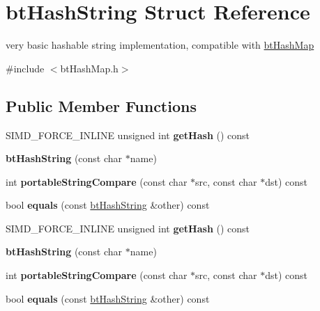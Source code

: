 \hypertarget{structbtHashString}{}\section{bt\+Hash\+String Struct Reference}
\label{structbtHashString}


very basic hashable string implementation, compatible with \hyperlink{classbtHashMap}{bt\+Hash\+Map}  




{\ttfamily \#include $<$bt\+Hash\+Map.\+h$>$}

\subsection*{Public Member Functions}
\begin{DoxyCompactItemize}
\item 
\mbox{\label{structbtHashString_aeaa1a7bd2e1424b713903fa836ee050e}} 
S\+I\+M\+D\+\_\+\+F\+O\+R\+C\+E\+\_\+\+I\+N\+L\+I\+NE unsigned int {\bfseries get\+Hash} () const
\item 
\mbox{\label{structbtHashString_a66defd26b7b6b4c56d2f4abd35379eee}} 
{\bfseries bt\+Hash\+String} (const char $\ast$name)
\item 
\mbox{\label{structbtHashString_a28c2b90627bc2c2345909f992d0955dd}} 
int {\bfseries portable\+String\+Compare} (const char $\ast$src, const char $\ast$dst) const
\item 
\mbox{\label{structbtHashString_a042484497f527e8a6a1265c2f852038d}} 
bool {\bfseries equals} (const \hyperlink{structbtHashString}{bt\+Hash\+String} \&other) const
\item 
\mbox{\label{structbtHashString_aeaa1a7bd2e1424b713903fa836ee050e}} 
S\+I\+M\+D\+\_\+\+F\+O\+R\+C\+E\+\_\+\+I\+N\+L\+I\+NE unsigned int {\bfseries get\+Hash} () const
\item 
\mbox{\label{structbtHashString_a66defd26b7b6b4c56d2f4abd35379eee}} 
{\bfseries bt\+Hash\+String} (const char $\ast$name)
\item 
\mbox{\label{structbtHashString_a28c2b90627bc2c2345909f992d0955dd}} 
int {\bfseries portable\+String\+Compare} (const char $\ast$src, const char $\ast$dst) const
\item 
\mbox{\label{structbtHashString_a042484497f527e8a6a1265c2f852038d}} 
bool {\bfseries equals} (const \hyperlink{structbtHashString}{bt\+Hash\+String} \&other) const
\end{DoxyCompactItemize}
